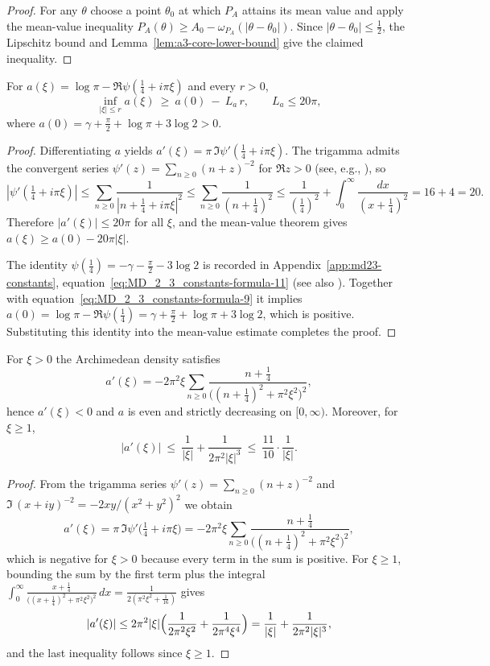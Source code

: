 \begin{proof}
For any $\theta$ choose a point $\theta_0$ at which $P_A$ attains its mean value and apply the mean-value inequality $P_A(\theta)\ge A_0 - \omega_{P_A}(|\theta-\theta_0|)$. Since $|\theta-\theta_0|\le \tfrac12$, the Lipschitz bound and Lemma~\ref{lem:a3-core-lower-bound} give the claimed inequality.
\end{proof}

\begin{lemma}\label{lem:a3-core-slope}
For $a(\xi)=\log\pi-\Re\psi(\tfrac14+i\pi\xi)$ and every $r>0$,
\[
  \inf_{|\xi|\le r} a(\xi)\ \ge\ a(0)\ -\ L_a\,r,
  \qquad L_a \le 20\pi,
\]
where
\(
  a(0)=\gamma + \frac{\pi}{2} + \log\pi + 3\log 2 > 0
\).
\end{lemma}
\begin{proof}
Differentiating $a$ yields
$a'(\xi) = \pi\,\Im\psi'(\tfrac14+i\pi\xi)$.
The trigamma admits the convergent series
\(
  \psi'(z)=\sum_{n\ge0}(n+z)^{-2}
\)
for $\Re z>0$ (see, e.g., \cite[Ch.~2]{Titchmarsh1986}), so
\[
  |\psi'(\tfrac14+i\pi\xi)|
  \le \sum_{n\ge0} \frac{1}{|n+\tfrac14+i\pi\xi|^2}
  \le \sum_{n\ge0} \frac{1}{(n+\tfrac14)^2}
  \le \frac{1}{(\tfrac14)^2} + \int_{0}^{\infty} \frac{dx}{(x+\tfrac14)^2}
  = 16 + 4 = 20.
\]
Therefore $|a'(\xi)|\le 20\pi$ for all $\xi$, and the mean-value theorem gives
$a(\xi)\ge a(0)-20\pi|\xi|$.

The identity
\(
  \psi(\tfrac14) = -\gamma - \tfrac{\pi}{2} - 3\log 2
\)
is recorded in Appendix~\ref{app:md23-constants}, equation~\eqref{eq:MD_2_3_constants-formula-11} (see also \cite[Ch.~2]{Titchmarsh1986}). Together with equation~\eqref{eq:MD_2_3_constants-formula-9} it implies
$a(0)=\log\pi-\Re\psi(\tfrac14)=\gamma+\tfrac{\pi}{2}+\log\pi+3\log 2$, which is positive. Substituting this identity into the mean-value estimate completes the proof.
\end{proof}

\begin{lemma}\label{lem:a3-a-monotone}
For $\xi>0$ the Archimedean density satisfies
\[
  a'(\xi)
  = -2\pi^2\xi\sum_{n\ge0}\frac{n+\tfrac14}{\bigl((n+\tfrac14)^2+\pi^2\xi^2\bigr)^2},
\]
hence $a'(\xi)<0$ and $a$ is even and strictly decreasing on $[0,\infty)$.
Moreover, for $\xi\ge 1$,
\[
  |a'(\xi)| \ \le\ \frac{1}{|\xi|}+\frac{1}{2\pi^2|\xi|^3}
  \ \le\ \frac{11}{10}\cdot\frac{1}{|\xi|}.
\]
\end{lemma}
\begin{proof}
From the trigamma series
\(
  \psi'(z)=\sum_{n\ge0}(n+z)^{-2}
\)
and $\Im\,(x+iy)^{-2}=-2xy/(x^2+y^2)^2$ we obtain
\[
  a'(\xi)=\pi\,\Im\psi'\bigl(\tfrac14+i\pi\xi\bigr)
  = -2\pi^2\xi\sum_{n\ge0}\frac{n+\tfrac14}{\bigl((n+\tfrac14)^2+\pi^2\xi^2\bigr)^2},
\]
which is negative for $\xi>0$ because every term in the sum is positive.
For $\xi\ge1$, bounding the sum by the first term plus the integral
\(
  \int_{0}^{\infty}\frac{x+\tfrac14}{\bigl((x+\tfrac14)^2+\pi^2\xi^2\bigr)^2}\,dx
  = \frac{1}{2(\pi^2\xi^2+\tfrac{1}{16})}
\)
gives
\[
  |a'(\xi)|\le 2\pi^2|\xi|\Bigl(\frac{1}{2\pi^2\xi^2}+\frac{1}{2\pi^4\xi^4}\Bigr)
  = \frac{1}{|\xi|}+\frac{1}{2\pi^2|\xi|^3},
\]
and the last inequality follows since $\xi\ge1$.
\end{proof}

